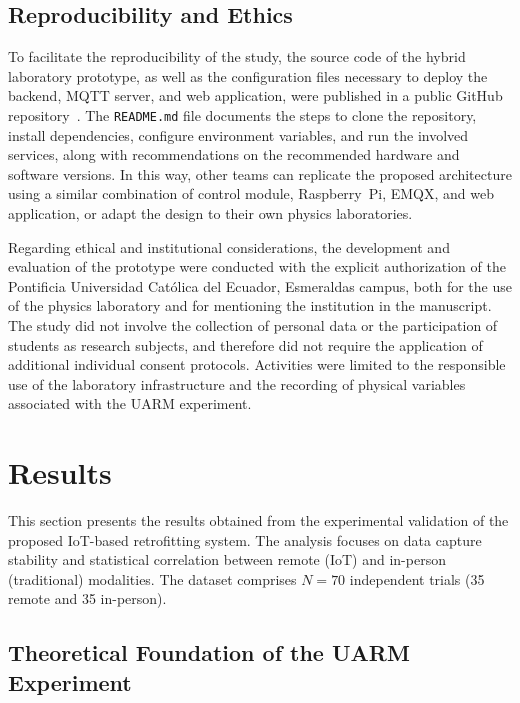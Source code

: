 \documentclass[sensors,article,submit,pdftex]{Definitions/mdpi}
\begin{document}
\subsection{Reproducibility and Ethics}

To facilitate the reproducibility of the study, the source code of the hybrid laboratory prototype, as well as the configuration files necessary to deploy the backend, MQTT server, and web application, were published in a public GitHub repository~\cite{r15}. The \texttt{README.md} file documents the steps to clone the repository, install dependencies, configure environment variables, and run the involved services, along with recommendations on the recommended hardware and software versions. In this way, other teams can replicate the proposed architecture using a similar combination of control module, Raspberry~Pi, EMQX, and web application, or adapt the design to their own physics laboratories.

Regarding ethical and institutional considerations, the development and evaluation of the prototype were conducted with the explicit authorization of the Pontificia Universidad Cat\'olica del Ecuador, Esmeraldas campus, both for the use of the physics laboratory and for mentioning the institution in the manuscript. The study did not involve the collection of personal data or the participation of students as research subjects, and therefore did not require the application of additional individual consent protocols. Activities were limited to the responsible use of the laboratory infrastructure and the recording of physical variables associated with the UARM experiment.


\section{Results}

This section presents the results obtained from the experimental validation of the proposed IoT-based retrofitting system. The analysis focuses on data capture stability and statistical correlation between remote (IoT) and in-person (traditional) modalities. The dataset comprises \(N=70\) independent trials (35 remote and 35 in-person).

\subsection{Theoretical Foundation of the UARM Experiment}
\end{document}
